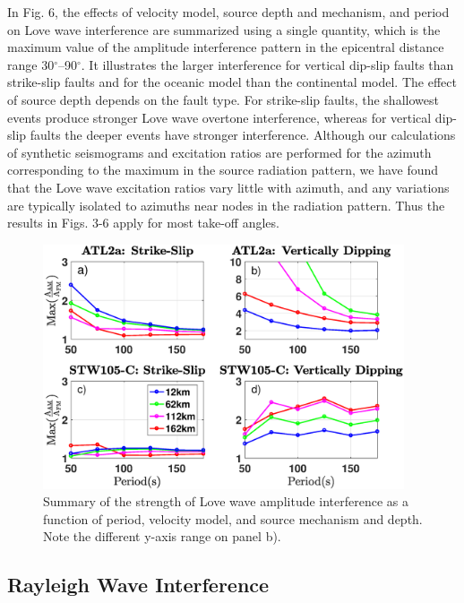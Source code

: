 \documentclass[extra,mreferee]{gji}
\begin{document}
 
In Fig. 6, the effects of velocity model, source depth and mechanism, and period on Love wave interference are summarized using a single quantity, which is the maximum value of the amplitude interference pattern in the epicentral distance range 30$^\circ$--90$^\circ$. It illustrates the larger interference for vertical dip-slip faults than strike-slip faults and for the oceanic model than the continental model. The effect of source depth depends on the fault type. For strike-slip faults, the shallowest events produce stronger Love wave overtone interference, whereas for vertical dip-slip faults the deeper events have stronger interference. Although our calculations of synthetic seismograms and excitation ratios are performed for the azimuth corresponding to the maximum in the source radiation pattern, we have found that the Love wave excitation ratios vary little with azimuth, and any variations are typically isolated to azimuths near nodes in the radiation pattern. Thus the results in Figs. 3-6 apply for most take-off angles. 
 
  \begin{figure}
 \includegraphics[width=0.95\textwidth]{Fig6.eps}
 \caption{Summary of the strength of Love wave amplitude interference as a function of period, velocity model, and source mechanism and depth. Note the different y-axis range on panel b). }
 \end{figure}

\subsection{Rayleigh Wave Interference}
\end{document}
